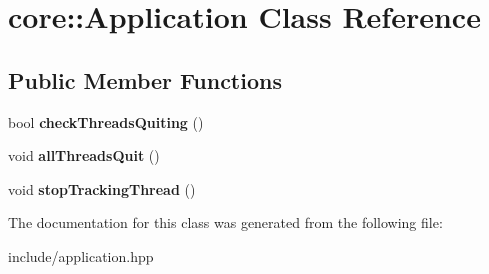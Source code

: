 \hypertarget{classcore_1_1_application}{\section{core\-:\-:Application Class Reference}
\label{classcore_1_1_application}
}
\subsection*{Public Member Functions}
\begin{DoxyCompactItemize}
\item 
\hypertarget{classcore_1_1_application_a151aa7113e48dd7ad19ed381f662c976}{bool {\bfseries check\-Threads\-Quiting} ()}\label{classcore_1_1_application_a151aa7113e48dd7ad19ed381f662c976}

\item 
\hypertarget{classcore_1_1_application_a7debfb67ab5f8d2daba75abc20a813a7}{void {\bfseries all\-Threads\-Quit} ()}\label{classcore_1_1_application_a7debfb67ab5f8d2daba75abc20a813a7}

\item 
\hypertarget{classcore_1_1_application_a326aac1d6f50064d84cfa886e61bf2e3}{void {\bfseries stop\-Tracking\-Thread} ()}\label{classcore_1_1_application_a326aac1d6f50064d84cfa886e61bf2e3}

\end{DoxyCompactItemize}


The documentation for this class was generated from the following file\-:\begin{DoxyCompactItemize}
\item 
include/application.\-hpp\end{DoxyCompactItemize}
